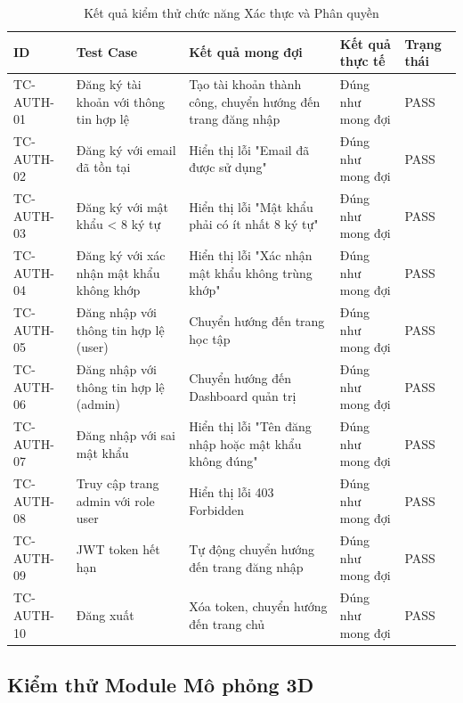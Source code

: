 \begin{table}[H]
\centering
\caption{Kết quả kiểm thử chức năng Xác thực và Phân quyền}
\begin{tabular}{|p{}|p{}|p{}|p{}|p{}|}
\hline
\textbf{ID} & \textbf{Test Case} & \textbf{Kết quả mong đợi} & \textbf{Kết quả thực tế} & \textbf{Trạng thái} \\
\hline
TC-AUTH-01 & Đăng ký tài khoản với thông tin hợp lệ & Tạo tài khoản thành công, chuyển hướng đến trang đăng nhập & Đúng như mong đợi & PASS \\
\hline
TC-AUTH-02 & Đăng ký với email đã tồn tại & Hiển thị lỗi "Email đã được sử dụng" & Đúng như mong đợi & PASS \\
\hline
TC-AUTH-03 & Đăng ký với mật khẩu < 8 ký tự & Hiển thị lỗi "Mật khẩu phải có ít nhất 8 ký tự" & Đúng như mong đợi & PASS \\
\hline
TC-AUTH-04 & Đăng ký với xác nhận mật khẩu không khớp & Hiển thị lỗi "Xác nhận mật khẩu không trùng khớp" & Đúng như mong đợi & PASS \\
\hline
TC-AUTH-05 & Đăng nhập với thông tin hợp lệ (user) & Chuyển hướng đến trang học tập & Đúng như mong đợi & PASS \\
\hline
TC-AUTH-06 & Đăng nhập với thông tin hợp lệ (admin) & Chuyển hướng đến Dashboard quản trị & Đúng như mong đợi & PASS \\
\hline
TC-AUTH-07 & Đăng nhập với sai mật khẩu & Hiển thị lỗi "Tên đăng nhập hoặc mật khẩu không đúng" & Đúng như mong đợi & PASS \\
\hline
TC-AUTH-08 & Truy cập trang admin với role user & Hiển thị lỗi 403 Forbidden & Đúng như mong đợi & PASS \\
\hline
TC-AUTH-09 & JWT token hết hạn & Tự động chuyển hướng đến trang đăng nhập & Đúng như mong đợi & PASS \\
\hline
TC-AUTH-10 & Đăng xuất & Xóa token, chuyển hướng đến trang chủ & Đúng như mong đợi & PASS \\
\hline
\end{tabular}
\end{table}

\subsection{Kiểm thử Module Mô phỏng 3D}

